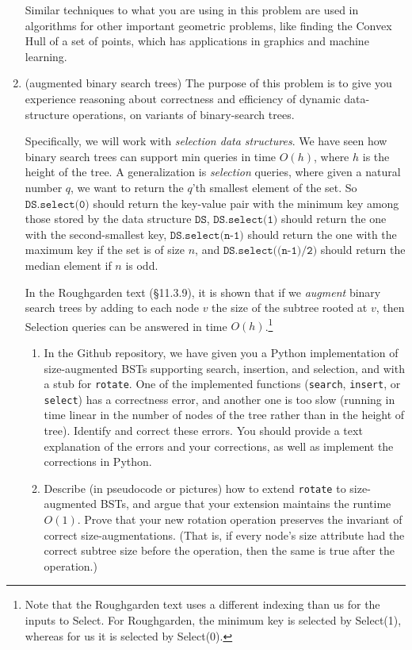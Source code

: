 \documentclass[11pt]{article}
\begin{document}
\begin{enumerate}
    Similar techniques to what you are using in this problem are used in algorithms for other important geometric problems, like finding the Convex Hull of a set of points, which has applications in graphics and machine learning.
    
    \newpage

    
    \item (augmented binary search trees) The purpose of this problem is to give you experience reasoning about correctness and efficiency of dynamic data-structure operations, on variants of binary-search trees. 
    
    Specifically, we will work with {\em selection data structures}.
    We have seen how binary search trees can support min queries in time $O(h)$, where $h$ is the height of the tree.  A generalization is {\em selection} queries, where given a natural number $q$, we want to return the $q$'th smallest element of the set.  So $\texttt{DS.select(0)}$ should return the key-value pair with the minimum key among those stored by the data structure $\texttt{DS}$, $\texttt{DS.select(1)}$ should return the one with the second-smallest key, $\texttt{DS.select(n-1)}$ should return the one with the maximum key if the set is of size $n$, and $\texttt{DS.select((n-1)/2)}$ should return the median element if $n$ is odd.
    
    In the Roughgarden text (\S11.3.9), it is shown that if we {\em augment} binary search trees by adding to each node $v$ the size of the subtree rooted at $v$, then Selection queries can be answered in time $O(h)$.\footnote{Note that the Roughgarden text uses a different indexing than us for the inputs to Select. For Roughgarden, the minimum key is selected by Select(1), whereas for us it is selected by Select(0).}
    
    \begin{enumerate}
        \item In the Github repository, we have given you a Python implementation of size-augmented BSTs supporting search, insertion, and selection, and with a stub for \texttt{rotate}. One of the implemented functions (\texttt{search}, \texttt{insert}, or \texttt{select}) has a correctness error, and another one is too slow (running in time linear in the number of nodes of the tree rather than in the height of tree). Identify and correct these errors. You should provide a text explanation of the errors and your corrections, as well as implement the corrections in Python.
        
        \item Describe (in pseudocode or pictures) how to extend \texttt{rotate} to size-augmented BSTs, and argue that your extension maintains the runtime $O(1)$. Prove that your new rotation operation preserves the invariant of correct size-augmentations. (That is, if every node's size attribute had the correct subtree size before the operation, then the same is true after the operation.)


\end{enumerate}
\end{enumerate}
\end{document}
